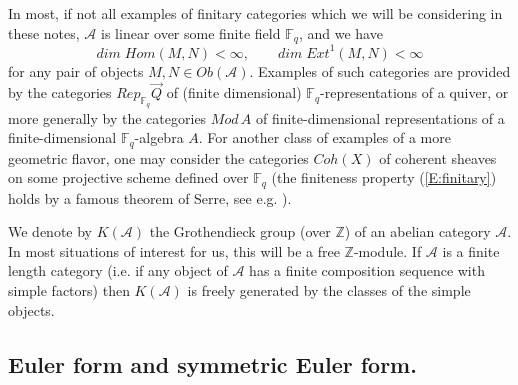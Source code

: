 \documentclass[a4paper,10pt]{amsart}
\def\Z{\mathbb{Z}}
\def\A{\mathcal{A}}
\numberwithin{equation}{section}
\begin{document}
\vspace{.05in}

In most, if not all examples of finitary categories which we will be considering in these notes, $\mathcal{A}$ is linear over some finite field $\mathbb{F}_q$, and we have
\begin{equation}\label{E:finitary}
{dim}\;{Hom}(M,N) < \infty, \qquad {dim}\;{Ext}^1(M,N) < \infty
\end{equation}
for any pair of objects $M,N \in {Ob}(\mathcal{A})$. Examples of such categories are provided by the categories ${Rep}_{\mathbb{F}_q}\vec{Q}$ of (finite dimensional) $\mathbb{F}_q$-representations of a quiver, or more generally by the categories ${Mod}\,A$ of finite-dimensional representations of a finite-dimensional $\mathbb{F}_q$-algebra $A$. For another class of examples of a more geometric flavor, one may consider the categories $Coh(X)$ of coherent sheaves on some projective scheme defined over $\mathbb{F}_q$ (the finiteness property (\ref{E:finitary}) holds by a famous theorem of Serre, see e.g. \cite{Hart}).

We denote by $K(\mathcal{A})$ the Grothendieck group (over $\Z$) of an abelian category $\mathcal{A}$. In most situations of interest for us, this will be a free $\Z$-module.
If $\A$ is a finite length category (i.e. if any object of $\mathcal{A}$ has a finite composition sequence with simple factors) then $K(\mathcal{A})$ is freely generated by the classes of the simple objects.

\vspace{.2in}

\subsection{Euler form and symmetric Euler form.}

\vspace{.15in}
\end{document}
